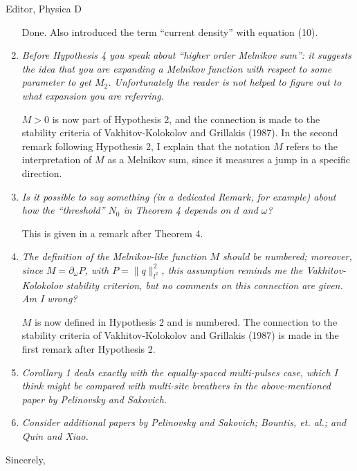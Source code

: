 \documentclass[11pt]{letter}
\begin{document}
\begin{letter}{Editor, Physica D}
\begin{enumerate}
Done. Also introduced the term ``current density'' with equation (10).

\item \emph{Before Hypothesis 4 you speak about ``higher order Melnikov sum'': it suggests the idea that you are expanding a Melnikov function with respect to some parameter to get $M_2$. Unfortunately the reader is not helped to figure out to what expansion you are referring.}

$M > 0$ is now part of Hypothesis 2, and the connection is made to the stability criteria of Vakhitov-Kolokolov and Grillakis (1987). In the second remark following Hypothesis 2, I explain that the notation $M$ refers to the interpretation of $M$ as a Melnikov sum, since it measures a jump in a specific direction.

\item \emph{Is it possible to say something (in a dedicated Remark, for example) about how the ``threshold'' $N_0$ in Theorem 4 depends on $d$ and $\omega$?}

This is given in a remark after Theorem 4.

\item \emph{The definition of the Melnikov-like function $M$ should be numbered; moreover, since $M = \partial_\omega P$, with $P = \|q\|_{l^2}^2$, this assumption reminds me the Vakhitov-Kolokolov stability criterion, but no comments on this connection are given. Am I wrong?}

$M$ is now defined in Hypothesis 2 and is numbered. The connection to the stability criteria of Vakhitov-Kolokolov and Grillakis (1987) is made in the first remark after Hypothesis 2.

\item \emph{Corollary 1 deals exactly with the equally-spaced multi-pulses case, which I think might be compared with multi-site breathers in the above-mentioned paper by Pelinovsky and Sakovich.}

\item \emph{Consider additional papers by Pelinovsky and Sakovich; Bountis, et. al.; and Quin and Xiao.}

\end{enumerate}

\closing{Sincerely,}

\end{letter}
\end{document}
